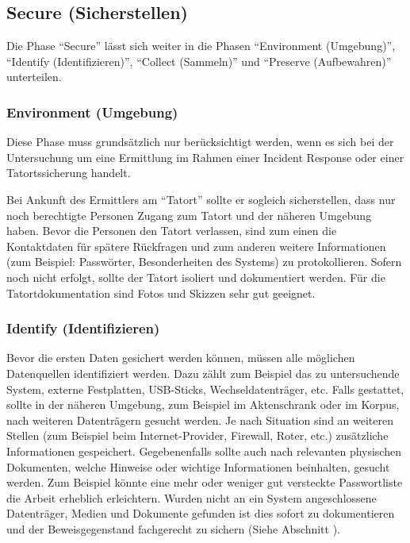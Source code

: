 \subsection{Secure (Sicherstellen)}
Die Phase "`Secure"' lässt sich weiter in die Phasen "`Environment (Umgebung)"', "`Identify (Identifizieren)"', "`Collect (Sammeln)"' und "`Preserve (Aufbewahren)"' unterteilen.


\subsubsection{Environment (Umgebung)}
Diese Phase muss grundsätzlich nur berücksichtigt werden, wenn es sich bei der Untersuchung um eine Ermittlung im Rahmen einer Incident Response oder einer Tatortssicherung handelt.

Bei Ankunft des Ermittlers am "`Tatort"' sollte er sogleich sicherstellen, dass nur noch berechtigte Personen Zugang zum Tatort und der näheren Umgebung haben. Bevor die Personen den Tatort verlassen, sind zum einen die Kontaktdaten für spätere Rückfragen und zum anderen weitere Informationen (zum Beispiel: Passwörter, Besonderheiten des Systems) zu protokollieren. Sofern noch nicht erfolgt, sollte der Tatort isoliert und dokumentiert werden. Für die Tatortdokumentation sind Fotos und Skizzen sehr gut geeignet.

\subsubsection{Identify (Identifizieren)}
Bevor die ersten Daten gesichert werden können, müssen alle möglichen Datenquellen identifiziert werden. Dazu zählt zum Beispiel das zu untersuchende System, externe Festplatten, USB-Sticks, Wechseldatenträger, etc. Falls gestattet, sollte in der näheren Umgebung, zum Beispiel im Aktenschrank oder im Korpus, nach weiteren Datenträgern gesucht werden. Je nach Situation sind an weiteren Stellen (zum Beispiel beim Internet-Provider, Firewall, Roter, etc.) zusätzliche Informationen gespeichert. Gegebenenfalls sollte auch nach relevanten physischen Dokumenten, welche Hinweise oder wichtige Informationen beinhalten, gesucht werden. Zum Beispiel könnte eine mehr oder weniger gut versteckte Passwortliste die Arbeit erheblich erleichtern. Wurden nicht an ein System angeschlossene Datenträger, Medien  und Dokumente gefunden ist dies sofort zu dokumentieren und der Beweisgegenstand fachgerecht zu sichern (Siehe Abschnitt ). 

